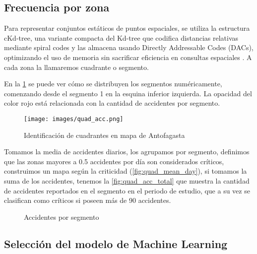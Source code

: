 \documentclass[12pt]{article}
\begin{document}

\subsection{Frecuencia por zona} \label{ssec:freq_zone}

Para representar conjuntos estáticos de puntos espaciales, se utiliza la estructura cKd-tree, una variante compacta del Kd-tree que codifica distancias relativas mediante spiral codes y las almacena usando Directly Addressable Codes (DACs), optimizando el uso de memoria sin sacrificar eficiencia en consultas espaciales \citep{gutierrez2023ckdtree}. A cada zona la llamaremos cuadrante o segmento.

En la \cref{fig:quad_acc} se puede ver cómo se distribuyen los segmentos numéricamente, comenzando desde el segmento 1 en la esquina inferior izquierda. La opacidad del color rojo está relacionada con la cantidad de accidentes por segmento.

\begin{figure}[H]
    \centering
    \texttt{[image: images/quad\_acc.png]}
    \caption{Identificación de cuadrantes en mapa de Antofagasta}
    \label{fig:quad_acc}
\end{figure}

Tomamos la media de accidentes diarios, los agrupamos por segmento, definimos que las zonas mayores a 0.5 accidentes por día son considerados críticos, construimos un mapa según la criticidad (\cref{fig:quad_mean_day}), si tomamos la suma de los accidentes, tenemos la \cref{fig:quad_acc_total} que muestra la cantidad de accidentes reportados en el segmento en el periodo de estudio, que a su vez se clasifican como críticos si poseen más de 90 accidentes.


\begin{figure}[H]
    \centering
    \caption{Accidentes por segmento}
\end{figure}




\subsection{Selección del modelo de Machine Learning}
\end{document}
